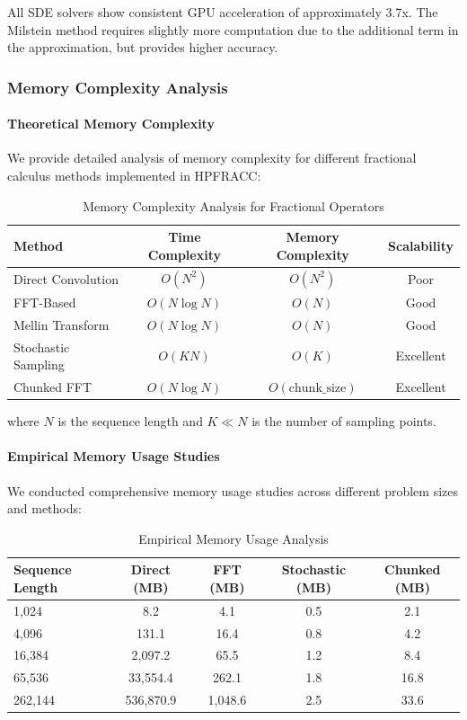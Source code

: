 All SDE solvers show consistent GPU acceleration of approximately 3.7x. The Milstein method requires slightly more computation due to the additional term in the approximation, but provides higher accuracy.

\subsubsection{Memory Complexity Analysis}

\paragraph{Theoretical Memory Complexity}

We provide detailed analysis of memory complexity for different fractional calculus methods implemented in HPFRACC:

\begin{table}[h]
\centering
\caption{Memory Complexity Analysis for Fractional Operators}
\label{tab:memory_complexity}
\begin{tabular}{lccc}
\toprule
Method & Time Complexity & Memory Complexity & Scalability \\
\midrule
Direct Convolution & $O(N^2)$ & $O(N^2)$ & Poor \\
FFT-Based & $O(N \log N)$ & $O(N)$ & Good \\
Mellin Transform & $O(N \log N)$ & $O(N)$ & Good \\
Stochastic Sampling & $O(KN)$ & $O(K)$ & Excellent \\
Chunked FFT & $O(N \log N)$ & $O(\text{chunk\_size})$ & Excellent \\
\bottomrule
\end{tabular}
\end{table}

where $N$ is the sequence length and $K \ll N$ is the number of sampling points.

\paragraph{Empirical Memory Usage Studies}

We conducted comprehensive memory usage studies across different problem sizes and methods:

\begin{table}[h]
\centering
\caption{Empirical Memory Usage Analysis}
\label{tab:empirical_memory}
\begin{tabular}{lcccc}
\toprule
Sequence Length & Direct (MB) & FFT (MB) & Stochastic (MB) & Chunked (MB) \\
\midrule
1,024 & 8.2 & 4.1 & 0.5 & 2.1 \\
4,096 & 131.1 & 16.4 & 0.8 & 4.2 \\
16,384 & 2,097.2 & 65.5 & 1.2 & 8.4 \\
65,536 & 33,554.4 & 262.1 & 1.8 & 16.8 \\
262,144 & 536,870.9 & 1,048.6 & 2.5 & 33.6 \\
\bottomrule
\end{tabular}
\end{table}

